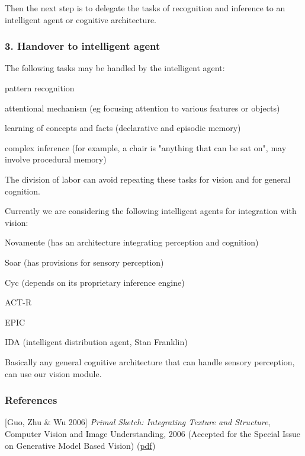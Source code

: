  Then the next step is to delegate the tasks of recognition and inference to an intelligent agent or cognitive architecture.

\subsubsection{3. Handover to intelligent agent}

The following tasks may be handled by the intelligent agent:
\begin{compactenum-}
	\item pattern recognition
	\item attentional mechanism (eg focusing attention to various features or objects)
	\item learning of concepts and facts (declarative and episodic memory)
	\item complex inference (for example, a chair is "anything that can be sat on", may involve procedural memory)
\end{compactenum-}

The division of labor can avoid repeating these tasks for vision and for general cognition.

Currently we are considering the following intelligent agents for integration with vision:
\begin{compactenum-}
	\item Novamente (has an architecture integrating perception and cognition)
	\item Soar (has provisions for sensory perception)
	\item Cyc (depends on its proprietary inference engine)
	\item ACT-R
	\item EPIC
	\item IDA (intelligent distribution agent, Stan Franklin)
\end{compactenum-}

Basically any general cognitive architecture that can handle sensory perception, can use our vision module.

\subsubsection{References}

[Guo,  Zhu \& Wu 2006] \emph{Primal Sketch: Integrating Texture and Structure}, 
Computer Vision and Image Understanding, 2006 (Accepted for the Special Issue on Generative Model Based Vision) (\href{http://www.stat.ucla.edu/~sczhu/papers/primal_sketch.pdf}{pdf})

